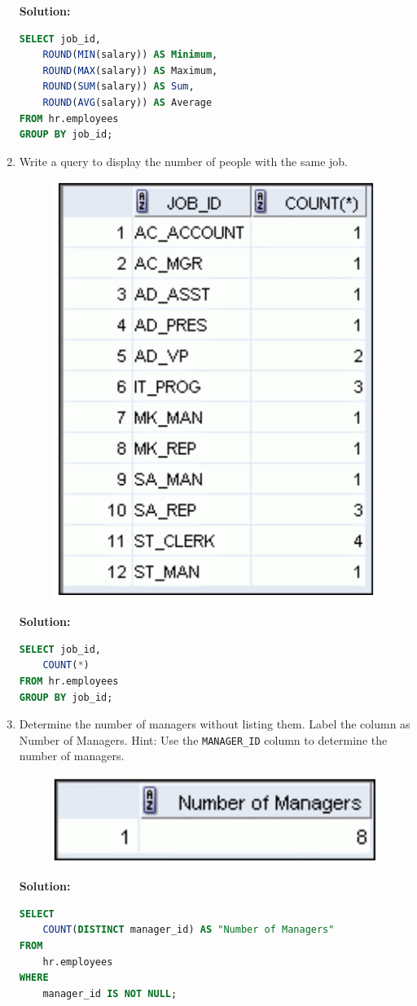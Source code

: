 \documentclass[a4paper,12pt]{article}
\begin{document}
\begin{enumerate}
    \textbf{Solution: }
    \begin{lstlisting}[language=SQL]
SELECT job_id,
    ROUND(MIN(salary)) AS Minimum,
    ROUND(MAX(salary)) AS Maximum,
    ROUND(SUM(salary)) AS Sum,
    ROUND(AVG(salary)) AS Average
FROM hr.employees
GROUP BY job_id;
    \end{lstlisting}
        \item Write a query to display the number of people with the same job.
    \begin{figure}[h]
        \centering
        \includegraphics[width=.5\linewidth]{graphics/66.1.png}
    \end{figure}

    \textbf{Solution: }
    \begin{lstlisting}[language=SQL]
SELECT job_id,
    COUNT(*) 
FROM hr.employees
GROUP BY job_id;
    \end{lstlisting}
        \item Determine the number of managers without listing them. Label the column as Number of
Managers. Hint: Use the \texttt{MANAGER\_ID} column to determine the number of managers.
    \begin{figure}[h]
        \centering
        \includegraphics[width=.5\linewidth]{graphics/67.png}
    \end{figure}

    \textbf{Solution: }
    \begin{lstlisting}[language=SQL]
SELECT 
    COUNT(DISTINCT manager_id) AS "Number of Managers"
FROM 
    hr.employees
WHERE 
    manager_id IS NOT NULL;


\end{lstlisting}
\end{enumerate}
\end{document}
